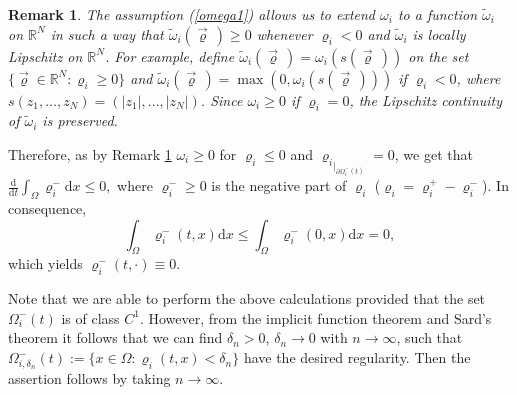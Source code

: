 \documentclass[11pt]{article}
\newcommand{\dd}{\mathrm{d}}
\newtheorem{rem}[tw]{Remark}
\numberwithin{equation}{section}
\numberwithin{tw}{section}
\begin{document}
\begin{rem}\label{omega_rem}
    The assumption (\ref{omega1}) allows us to extend $\omega_i$ to a function $\tilde\omega_i$ on $\mathbb{R}^N$ in such a way that $\tilde\omega_i(\vec\varrho\,)\geq 0$ whenever $\varrho_i<0$ and $\tilde\omega_i$ is locally Lipschitz on $\mathbb{R}^N$. For example, define $\tilde\omega_i(\vec\varrho\,)=\omega_i(s(\vec\varrho\,))$ on the set $\{\vec\varrho\in\mathbb{R}^N: \varrho_i\geq 0\}$ and $\tilde\omega_i(\vec\varrho\,)=\max(0,\omega_i(s(\vec\varrho\,)))$ if $\varrho_i<0$, where $s(z_1,\dots,z_N)=(|z_1|,\dots, |z_N|)$. Since $\omega_i\geq 0$ if $\varrho_i=0$, the Lipschitz continuity of $\tilde\omega_i$ is preserved.
\end{rem}


Therefore, as by Remark \ref{omega_rem} $\omega_i\geq 0$ for $\varrho_i\leq 0$ and  ${\varrho_i}_{|_{\partial\Omega_i^-(t)}}=0$, we get that
$\displaystyle  \frac{\dd}{\dd t}\int_{\Omega}\varrho_i^-\dd x \leq 0,$
where $\varrho_i^-\geq 0$ is the negative part of $\varrho_i$ ($\varrho_i=\varrho_i^+-\varrho_i^-$). In consequence,
$$\int_\Omega \varrho_i^-(t,x)\dd x \leq \int_\Omega \varrho_i^-(0,x)\dd x = 0,$$
which yields $\varrho_i^-(t,\cdot)\equiv 0$. 

Note that we are able to perform the above calculations provided that the set $\Omega_i^-(t)$ is of class $C^1$. However, from the implicit function theorem and Sard's theorem \cite{sard} it follows that we can find $\delta_n>0$, $\delta_n\to 0$ with $n\to\infty$, such that $\Omega_{i,\delta_n}^-(t):=\{x\in\Omega: \varrho_i(t,x)<\delta_n\}$ have the desired regularity. Then the assertion follows by taking $n\to\infty$.



 
\end{document}

